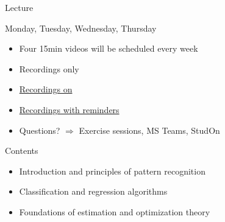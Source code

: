 \begin{frame}[t]{Lecture}

    Monday, Tuesday, Wednesday, Thursday

    \vspace{0.3cm}
    \begin{itemize}
        \setlength\itemsep{0.3cm}
        \item Four 15min videos will be scheduled every week
        \item Recordings only
        \item \href{https://www.video.uni-erlangen.de/course/id/1579}{Recordings on }
        \item \href{https://www.youtube.com/watch?v=8cZ-ljrSaEw&list=PLpOGQvPCDQzsWvT_bqmexrJ359RTQQuMO}{Recordings with  reminders}
        \item Questions? $\Rightarrow$ Exercise sessions, MS Teams, StudOn
    \end{itemize}
    \vspace{0.3cm}
    \begin{block}{Contents}
        \begin{itemize}
            \setlength\itemsep{0.1cm}
            \item Introduction and principles of pattern recognition
            \item Classification and regression algorithms
            \item Foundations of estimation and optimization theory
        \end{itemize}
    \end{block}
\end{frame}

